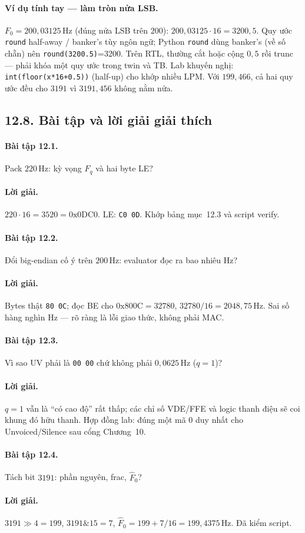 \paragraph{Ví dụ tính tay --- làm tròn nửa LSB.} $F_0=200{,}03125\,\text{Hz}$ (đúng nửa LSB trên $200$): $200{,}03125\cdot 16=3200{,}5$. Quy ước \texttt{round} half-away / banker's tùy ngôn ngữ; Python \texttt{round} dùng banker's (về số chẵn) nên \texttt{round(3200.5)}=3200. Trên RTL, thường cắt hoặc cộng $0{,}5$ rồi trunc --- phải khóa một quy ước trong twin và TB. Lab khuyến nghị: \texttt{int(floor(x*16+0.5))} (half-up) cho khớp nhiều LPM. Với $199{,}466$, cả hai quy ước đều cho $3191$ vì $3191{,}456$ không nằm nửa.

\subsection*{12.8. Bài tập và lời giải giải thích}

\paragraph{Bài tập 12.1.} Pack $220\,\text{Hz}$: kỳ vọng $F_q$ và hai byte LE?

\paragraph{Lời giải.} $220\cdot 16=3520=0\text{x}0\text{DC}0$. LE: \texttt{C0 0D}. Khớp bảng mục~12.3 và script verify.

\paragraph{Bài tập 12.2.} Đổi big-endian cố ý trên $200\,\text{Hz}$: evaluator đọc ra bao nhiêu Hz?

\paragraph{Lời giải.} Bytes thật \texttt{80 0C}; đọc BE cho $0\text{x}800\text{C}=32780$, $32780/16=2048{,}75\,\text{Hz}$. Sai số hàng nghìn Hz --- rõ ràng là lỗi giao thức, không phải MAC.

\paragraph{Bài tập 12.3.} Vì sao UV phải là \texttt{00 00} chứ không phải $0{,}0625\,\text{Hz}$ ($q=1$)?

\paragraph{Lời giải.} $q=1$ vẫn là ``có cao độ'' rất thấp; các chỉ số VDE/FFE và logic thanh điệu sẽ coi khung đó hữu thanh. Hợp đồng lab: đúng một mã $0$ duy nhất cho Unvoiced/Silence sau cổng Chương~10.

\paragraph{Bài tập 12.4.} Tách bit $3191$: phần nguyên, frac, $\hat F_0$?

\paragraph{Lời giải.} $3191\gg 4=199$, $3191\& 15=7$, $\hat F_0=199+7/16=199{,}4375\,\text{Hz}$. Đã kiểm script.
